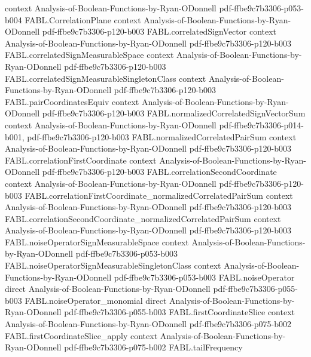 \begin{theorem}
  {context}
  {Analysis-of-Boolean-Functions-by-Ryan-ODonnell}
  {pdf-ffbe9c7b3306-p053-b004}
\proofstep
  {FABL.CorrelationPlane}
  {context}
  {Analysis-of-Boolean-Functions-by-Ryan-ODonnell}
  {pdf-ffbe9c7b3306-p120-b003}
\proofstep
  {FABL.correlatedSignVector}
  {context}
  {Analysis-of-Boolean-Functions-by-Ryan-ODonnell}
  {pdf-ffbe9c7b3306-p120-b003}
\proofstep
  {FABL.correlatedSignMeasurableSpace}
  {context}
  {Analysis-of-Boolean-Functions-by-Ryan-ODonnell}
  {pdf-ffbe9c7b3306-p120-b003}
\proofstep
  {FABL.correlatedSignMeasurableSingletonClass}
  {context}
  {Analysis-of-Boolean-Functions-by-Ryan-ODonnell}
  {pdf-ffbe9c7b3306-p120-b003}
\proofstep
  {FABL.pairCoordinatesEquiv}
  {context}
  {Analysis-of-Boolean-Functions-by-Ryan-ODonnell}
  {pdf-ffbe9c7b3306-p120-b003}
\proofstep
  {FABL.normalizedCorrelatedSignVectorSum}
  {context}
  {Analysis-of-Boolean-Functions-by-Ryan-ODonnell}
  {pdf-ffbe9c7b3306-p014-b001,
    pdf-ffbe9c7b3306-p120-b003}
\proofstep
  {FABL.normalizedCorrelatedPairSum}
  {context}
  {Analysis-of-Boolean-Functions-by-Ryan-ODonnell}
  {pdf-ffbe9c7b3306-p120-b003}
\proofstep
  {FABL.correlationFirstCoordinate}
  {context}
  {Analysis-of-Boolean-Functions-by-Ryan-ODonnell}
  {pdf-ffbe9c7b3306-p120-b003}
\proofstep
  {FABL.correlationSecondCoordinate}
  {context}
  {Analysis-of-Boolean-Functions-by-Ryan-ODonnell}
  {pdf-ffbe9c7b3306-p120-b003}
\proofstep
  {FABL.correlationFirstCoordinate_normalizedCorrelatedPairSum}
  {context}
  {Analysis-of-Boolean-Functions-by-Ryan-ODonnell}
  {pdf-ffbe9c7b3306-p120-b003}
\proofstep
  {FABL.correlationSecondCoordinate_normalizedCorrelatedPairSum}
  {context}
  {Analysis-of-Boolean-Functions-by-Ryan-ODonnell}
  {pdf-ffbe9c7b3306-p120-b003}
\proofstep
  {FABL.noiseOperatorSignMeasurableSpace}
  {context}
  {Analysis-of-Boolean-Functions-by-Ryan-ODonnell}
  {pdf-ffbe9c7b3306-p053-b003}
\proofstep
  {FABL.noiseOperatorSignMeasurableSingletonClass}
  {context}
  {Analysis-of-Boolean-Functions-by-Ryan-ODonnell}
  {pdf-ffbe9c7b3306-p053-b003}
\proofstep
  {FABL.noiseOperator}
  {direct}
  {Analysis-of-Boolean-Functions-by-Ryan-ODonnell}
  {pdf-ffbe9c7b3306-p055-b003}
\proofstep
  {FABL.noiseOperator_monomial}
  {direct}
  {Analysis-of-Boolean-Functions-by-Ryan-ODonnell}
  {pdf-ffbe9c7b3306-p055-b003}
\proofstep
  {FABL.firstCoordinateSlice}
  {context}
  {Analysis-of-Boolean-Functions-by-Ryan-ODonnell}
  {pdf-ffbe9c7b3306-p075-b002}
\proofstep
  {FABL.firstCoordinateSlice_apply}
  {context}
  {Analysis-of-Boolean-Functions-by-Ryan-ODonnell}
  {pdf-ffbe9c7b3306-p075-b002}
\proofstep
  {FABL.tailFrequency}

\end{theorem}
